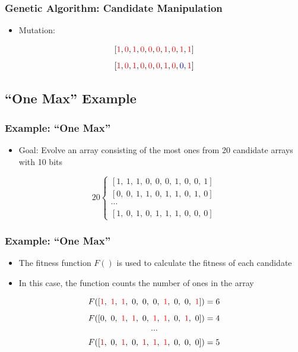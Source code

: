 \documentclass{beamer}
\begin{document}
\begin{frame}
  \frametitle{Genetic Algorithm: Candidate Manipulation}
\begin{itemize}
  \item Mutation:
\end{itemize}
\[
[ \textcolor{red}{1},  \textcolor{red}{0}, \textcolor{red}{1},  \textcolor{red}{0},  \textcolor{red}{0},  \textcolor{red}{0}, \textcolor{red}{1}, \textcolor{red}{0}, \textcolor{red}{1}, \textcolor{red}{1} ]
\]
\[[ \textcolor{red}{1},  \textcolor{red}{0}, \textcolor{red}{1},  \textcolor{red}{0},  \textcolor{red}{0},  \textcolor{red}{0}, \textcolor{red}{1}, \textcolor{red}{0}, \textcolor{blue}{0}, \textcolor{red}{1} ]
\]
\end{frame}

\subsection{``One Max'' Example}
\begin{frame}
  \frametitle{Example: ``One Max''}
\begin{itemize}
\item Goal: Evolve an array consisting of the most ones from 20 candidate arrays with 10 bits
\end{itemize}
\[
20 \left\{\begin{matrix}
[  1,~1,~1,~0,~ 0,~0,~1,~0,~0,~1] \\ %
[  0,~0,~1,~1,~ 0,~1,~1,~0,~1,~0] \\
\cdots\\
[  1 ,~0,~1,~0,~ 1,~1,~1,~0,~0,~0] 
\end{matrix}\right.
\]
\end{frame}

\begin{frame}
  \frametitle{Example: ``One Max''}
\begin{itemize}
\item The fitness function $F()$ is used to calculate the fitness of each candidate
\item In this case, the function counts the number of ones in the array
\end{itemize}

\[F([   \textcolor{red}{1},~\textcolor{red}{1},~ \textcolor{red}{1},~0,~ 0,~0,~\textcolor{red}{1},~ 0,~ 0,~ \textcolor{red}{1}]  ) = 6 \]%
\[F([  0 ,~0,~ \textcolor{red}{1},~ \textcolor{red}{1},~ 0,~ \textcolor{red}{1},~ \textcolor{red}{1},~0,~ \textcolor{red}{1},~0]) = 4\]
\[\cdots\]
\[F([   \textcolor{red}{1},~0,~ \textcolor{red}{1},~0,~  \textcolor{red}{1},~ \textcolor{red}{1},~ \textcolor{red}{1},~0,~0,~0]) = 5\]
\end{frame}
\end{document}

